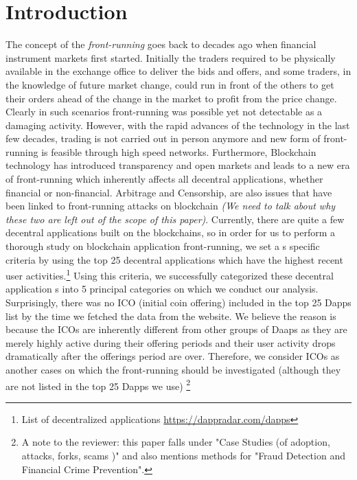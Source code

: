 \section{Introduction}

The concept of the \emph{front-running} goes back to decades ago when financial instrument markets first started. Initially the traders required to be physically available in the exchange office to deliver the bids and offers, and some traders, in the knowledge of future market change, could run in front of the others to get their orders ahead of the change in the market to profit from the price change. Clearly in such scenarios front-running was possible yet not detectable as a damaging activity. However, with the rapid advances of the technology in the last few decades, trading is not carried out in person anymore and new form of front-running is feasible through high speed networks. Furthermore, Blockchain technology has introduced transparency and open markets and leads to a new era of front-running which inherently affects all decentral applications, whether financial or non-financial. Arbitrage and Censorship, are also issues that have been linked to front-running attacks on blockchain \textit{(We need to talk about why these two are left out of the scope of this paper)}. Currently, there are quite a few decentral applications built on the blockchains, so in order for us to perform a thorough study on blockchain application front-running, we set a s specific criteria by using the top 25 decentral applications which have the highest recent user activities.\footnote{List of decentralized applications \url{https://dappradar.com/dapps}} Using this criteria, we successfully categorized these decentral application s into 5 principal categories on which we conduct our analysis. Surprisingly, there was no ICO (initial coin offering) included in the top 25 Dapps list by the time we fetched the data from the website. We believe the reason is because the ICOs are inherently different from other groups of Daaps as they are merely highly active during their offering periods and their user activity drops dramatically after the offerings period are over. Therefore, we  consider ICOs as another cases on which the front-running should be investigated (although they are not listed in the top 25 Dapps we use) \footnote{A note to the reviewer: this paper falls under "Case Studies (\eg of adoption, attacks, forks, scams \etc)" and also mentions methods for "Fraud Detection and Financial Crime Prevention".}

